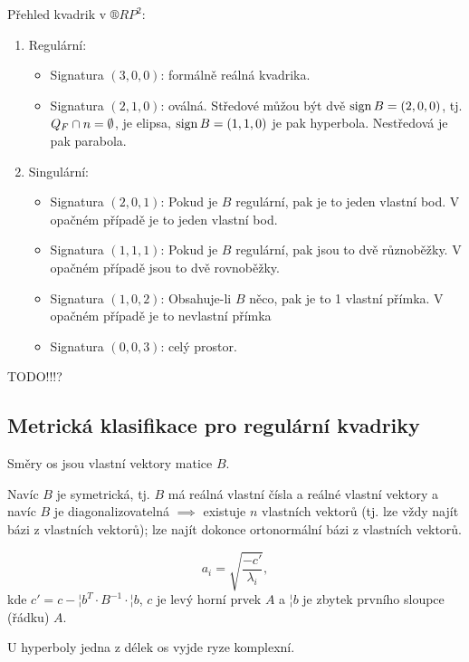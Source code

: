 \documentclass[12pt]{article}					%
\begin{document}
\begin{tvrzeni}
	Přehled kvadrik v $®RP^2$:
	\begin{enumerate}
		\item Regulární:
			\begin{itemize}
				\item Signatura $(3, 0, 0)$: formálně reálná kvadrika.
				\item Signatura $(2, 1, 0)$: oválná. Středové můžou být dvě $\operatorname{sign} B = (2, 0, 0)$, tj. $Q_F \cap n = \emptyset$, je elipsa, $\operatorname{sign} B = (1, 1, 0)$ je pak hyperbola. Nestředová je pak parabola.
			\end{itemize}
		\item Singulární:
			\begin{itemize}
				\item Signatura $(2, 0, 1)$: Pokud je $B$ regulární, pak je to jeden vlastní bod. V opačném případě je to jeden vlastní bod.
				\item Signatura $(1, 1, 1)$: Pokud je $B$ regulární, pak jsou to dvě různoběžky. V opačném případě jsou to dvě rovnoběžky.
				\item Signatura $(1, 0, 2)$: Obsahuje-li $B$ něco, pak je to 1 vlastní přímka. V opačném případě je to nevlastní přímka
				\item Signatura $(0, 0, 3)$: celý prostor.
			\end{itemize}
	\end{enumerate}
\end{tvrzeni}


TODO!!!?


\subsection{Metrická klasifikace pro regulární kvadriky}
\begin{poznamka}
	Směry os jsou vlastní vektory matice $B$.

	Navíc $B$ je symetrická, tj. $B$ má reálná vlastní čísla a reálné vlastní vektory a navíc $B$ je diagonalizovatelná $\implies$ existuje $n$ vlastních vektorů (tj. lze vždy najít bázi z vlastních vektorů); lze najít dokonce ortonormální bázi z vlastních vektorů.
\end{poznamka}

\begin{definice}
	$$ a_i = \sqrt{\frac{-c'}{λ_i}}, $$
	kde $c' = c - ¦b^T·B^{-1}·¦b$, $c$ je levý horní prvek $A$ a $¦b$ je zbytek prvního sloupce (řádku) $A$.

	\begin{poznamkain}
		U hyperboly jedna z délek os vyjde ryze komplexní.
	\end{poznamkain}
\end{definice}
\end{document}
